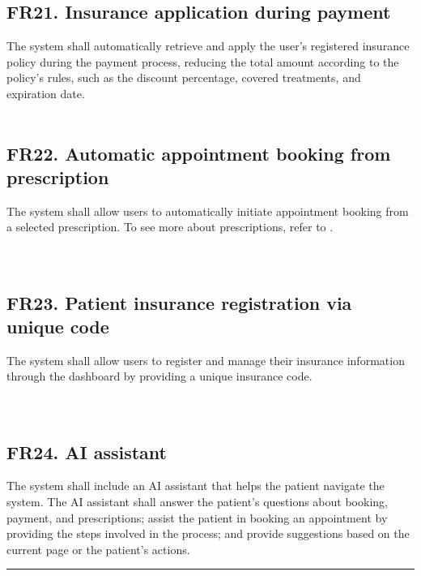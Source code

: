 \documentclass[12pt, a4paper]{article}
\begin{document}
\subsection{FR21. Insurance application during payment} \label{FR21}
The system shall automatically retrieve and apply the user's registered insurance policy during the payment process, reducing the total amount according to the policy's rules, such as the discount percentage, covered treatments, and expiration date.
\\ 
\\ 

\subsection{FR22. Automatic appointment booking from prescription} \label{FR22}
The system shall allow users to automatically initiate appointment booking from a selected prescription. To see more about prescriptions, refer to .
\\ 
\\ 
\\ 

\subsection{FR23. Patient insurance registration via unique code} \label{FR23}
The system shall allow users to register and manage their insurance information through the dashboard by providing a unique insurance code.
\\ 
\\ 
\\ 

\subsection{FR24. AI assistant} \label{FR24}
The system shall include an AI assistant that helps the patient navigate the system. The AI assistant shall answer the patient's questions about booking, payment, and prescriptions; assist the patient in booking an appointment by providing the steps involved in the process; and provide suggestions based on the current page or the patient's actions.
\\ 

\noindent\rule{\textwidth}{0.4pt}
\medskip
\end{document}
